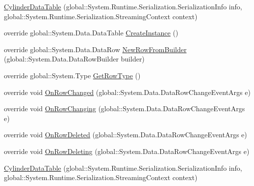 \begin{DoxyCompactItemize}
\item 
\hyperlink{class_env_int_1_1_win32_1_1_field_tech_1_1_manager_1_1_data_sets_1_1_guide_ware_mobile_data_set_1_1_cylinder_data_table_a258e3b51eaf18fbeddcc4d575676d69b}{Cylinder\+Data\+Table} (global\+::\+System.\+Runtime.\+Serialization.\+Serialization\+Info info, global\+::\+System.\+Runtime.\+Serialization.\+Streaming\+Context context)
\item 
override global\+::\+System.\+Data.\+Data\+Table \hyperlink{class_env_int_1_1_win32_1_1_field_tech_1_1_manager_1_1_data_sets_1_1_guide_ware_mobile_data_set_1_1_cylinder_data_table_a16eb2d36bd7516bc5af885189880a72b}{Create\+Instance} ()
\item 
override global\+::\+System.\+Data.\+Data\+Row \hyperlink{class_env_int_1_1_win32_1_1_field_tech_1_1_manager_1_1_data_sets_1_1_guide_ware_mobile_data_set_1_1_cylinder_data_table_a38286642d38d801bc251b7975c6f6d84}{New\+Row\+From\+Builder} (global\+::\+System.\+Data.\+Data\+Row\+Builder builder)
\item 
override global\+::\+System.\+Type \hyperlink{class_env_int_1_1_win32_1_1_field_tech_1_1_manager_1_1_data_sets_1_1_guide_ware_mobile_data_set_1_1_cylinder_data_table_acc365930b6087f2209b79e86611b3efe}{Get\+Row\+Type} ()
\item 
override void \hyperlink{class_env_int_1_1_win32_1_1_field_tech_1_1_manager_1_1_data_sets_1_1_guide_ware_mobile_data_set_1_1_cylinder_data_table_a01ac482823827536c078abe89876b20c}{On\+Row\+Changed} (global\+::\+System.\+Data.\+Data\+Row\+Change\+Event\+Args e)
\item 
override void \hyperlink{class_env_int_1_1_win32_1_1_field_tech_1_1_manager_1_1_data_sets_1_1_guide_ware_mobile_data_set_1_1_cylinder_data_table_a8c6b982bdfca7c8bfb0e325ce3c96ce6}{On\+Row\+Changing} (global\+::\+System.\+Data.\+Data\+Row\+Change\+Event\+Args e)
\item 
override void \hyperlink{class_env_int_1_1_win32_1_1_field_tech_1_1_manager_1_1_data_sets_1_1_guide_ware_mobile_data_set_1_1_cylinder_data_table_a2baad04e898e7aa406c5731bdddc9c85}{On\+Row\+Deleted} (global\+::\+System.\+Data.\+Data\+Row\+Change\+Event\+Args e)
\item 
override void \hyperlink{class_env_int_1_1_win32_1_1_field_tech_1_1_manager_1_1_data_sets_1_1_guide_ware_mobile_data_set_1_1_cylinder_data_table_a1a127a8fa6bae0950429d9ec3b7624ae}{On\+Row\+Deleting} (global\+::\+System.\+Data.\+Data\+Row\+Change\+Event\+Args e)
\item 
\hyperlink{class_env_int_1_1_win32_1_1_field_tech_1_1_manager_1_1_data_sets_1_1_guide_ware_mobile_data_set_1_1_cylinder_data_table_a258e3b51eaf18fbeddcc4d575676d69b}{Cylinder\+Data\+Table} (global\+::\+System.\+Runtime.\+Serialization.\+Serialization\+Info info, global\+::\+System.\+Runtime.\+Serialization.\+Streaming\+Context context)

\end{DoxyCompactItemize}
